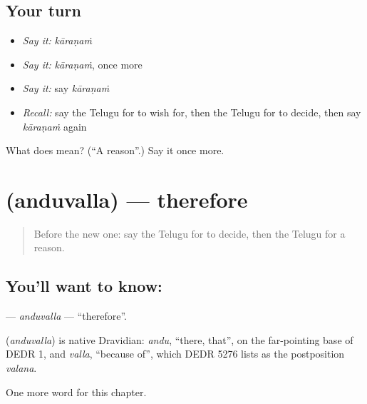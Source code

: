 \subsection*{Your turn}
\begin{itemize}
\raggedright
  \item \emph{Say it:} \emph{kāraṇaṁ}
  \item \emph{Say it:} \emph{kāraṇaṁ}, once more
  \item \emph{Say it:} say \emph{kāraṇaṁ}
  \item \emph{Recall:} say the Telugu for to wish for, then the Telugu for to decide, then say \emph{kāraṇaṁ} again
\end{itemize}

\begin{tcolorbox}[breakable,colback=teal!4,colframe=teal!35!black,title={Before you move on}]
What does  mean? (\textquotedblleft{}A reason\textquotedblright{}.) Say it once more.
\end{tcolorbox}
\section[\texorpdfstring{\te{అందువల్ల} (anduvalla)}{అందువల్ల (anduvalla)}]{ (anduvalla) — therefore}

\label{lesson:TE-C108-anduvalla}



\begin{quote}
Before the new one: say the Telugu for to decide, then the Telugu for a reason.
\end{quote}

\subsection*{You'll want to know: }
\textbf{} — \emph{anduvalla} — \textquotedblleft{}therefore\textquotedblright{}.

\begin{cousinweb}
\textbf{} (\emph{anduvalla}) is native Dravidian: \emph{andu}, \textquotedblleft{}there, that\textquotedblright{}, on the far-pointing base of DEDR 1, and \emph{valla}, \textquotedblleft{}because of\textquotedblright{}, which DEDR 5276 lists as the postposition \emph{valana}.
\end{cousinweb}

\begin{grammarlens}[title={What you've built}]
One more word for this chapter.
\end{grammarlens}


